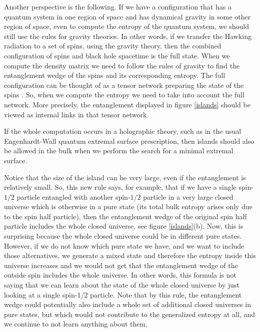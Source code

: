 \documentclass[11pt]{article}
\begin{document}
Another perspective is the following. 
If we have a configuration that has a quantum system in one region of space and has dynamical gravity in some other region of space, even to compute the entropy of the quantum system, we should still use the rules for gravity theories.
In other words, if we transfer the Hawking radiation to a set of spins, using the gravity theory, then the combined configuration of spins and black hole spacetime is the full state. When we compute the density matrix we need to follow the rules of gravity to find the entanglement wedge of the spins and its corresponding entropy.
The full configuration can be thought of as a tensor network preparing the state of the spins \cite{Swingle:2009bg}\cite{Hartman:2013qma}. 
So, when we compute the entropy we need to take into account the full network. 
More precisely, the entanglement displayed in figure \ref{islands} should be viewed as internal links in that tensor network.


If the whole computation occurs in a holographic theory, such as in the usual Engenhardt-Wall \cite{Engelhardt:2014gca} quantum extremal surface prescription, then islands should also be allowed in the bulk when we perform the search for a minimal extremal surface.  


Notice that the size of the island can be very large, even if the entanglement is relatively small. 
So, this new rule says, for example, that if we have a single spin-$1/2$ particle entangled with another spin-$1/2$ particle in a very large closed universe which is otherwise in a pure state (its total bulk entropy arises only due to the spin half particle), then the entanglement wedge of the original spin half particle includes the whole closed universe, see figure \ref{islands}(b).
Now, this is surprising because the whole closed universe could be in different pure states. 
However, if we do not know which pure state we have, and we want to include those alternatives, we generate a mixed state and therefore  the entropy inside this universe increases and we would not get that the entanglement wedge of the outside spin includes the whole universe. 
In other words, this formula is not saying that we can learn about the state of the whole closed universe by just looking at a single spin-1/2 particle. 
Note that by this rule, the entanglement wedge could potentially also include a whole set of additional closed universes in pure states, but which would not contribute to the generalized entropy at all, and we continue to not learn anything about them.
\end{document}
